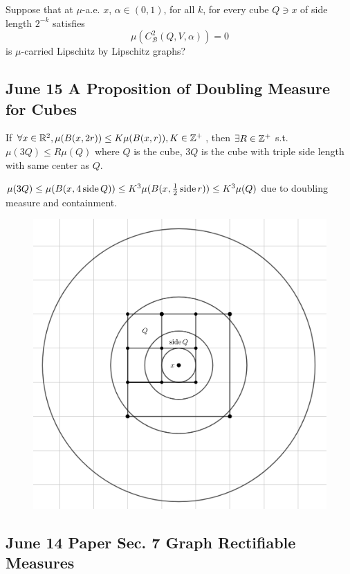 \begin{problem}
    Suppose that at $\mu$-a.e. $x$, $\alpha\in(0, 1)$, for all $k$, for every cube $Q\ni x$ of side length $2^{-k}$ satisfies
    $$
    \mu(C^2_\mathcal{B}(Q, V, \alpha)) = 0
    $$ 
    is $\mu$-carried Lipschitz by Lipschitz graphs?
\end{problem}

\newpage
\subsection{June 15 A Proposition of Doubling Measure for Cubes}

\begin{proposition}
    If $\forall x\in \mathbb{R}^2, \mu(B(x, 2r))\leq K\mu(B(x,r)), K\in\mathbb{Z}^+$, then $\exists R\in \mathbb{Z}^+$ s.t. $\mu(3Q)\leq R\mu(Q)$ where $Q$ is the cube, 3$Q$ is the cube with triple side length with same center as $Q$. 
\end{proposition}
\proof  $\mu(3Q) \leq \mu(B(x, 4\operatorname{side} Q)) \leq K^3\mu(B(x, \frac{1}{2} \operatorname{side} r))\leq K^3 \mu(Q)$ due to doubling measure and containment. 

\begin{figure}[H]
    \centering
    \includegraphics[width=.66\textwidth]{images/tripleMcube.png}
\end{figure}


\newpage
\subsection{June 14 Paper \texorpdfstring{\cite{naples2020}}{Lg} Sec. 7 Graph Rectifiable Measures}


